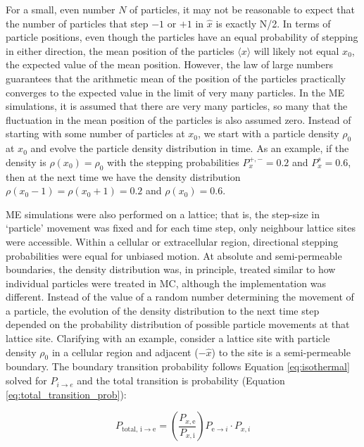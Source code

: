 	For a small, even number $ N $ of particles, it may not be reasonable to expect that the number of particles that step $ -1 $ or $ +1 $ in $ \hat{x} $ is exactly N/2. In terms of particle positions, even though the particles have an equal probability of stepping in either direction, the mean position of the particles $ \langle x \rangle $ will likely not equal $ x_0 $, the expected value of the mean position. However, the law of large numbers guarantees that the arithmetic mean of the position of the particles practically converges to the expected value in the limit of very many particles. In the ME simulations, it is assumed that there are very many particles, so many that the fluctuation in the mean position of the particles is also assumed zero. Instead of starting with some number of particles at $ x_0 $, we start with a particle density $ \rho_0 $ at $ x_0 $ and evolve the particle density distribution in time. As an example, if the density is $ \rho(x_0) = \rho_0 $ with the stepping probabilities $ P_x^{+,-} = 0.2 $ and $ P_x^{s} = 0.6 $, then at the next time we have the density distribution $ \rho(x_0 - 1) = \rho(x_0 + 1) = 0.2 $ and $ \rho(x_0) = 0.6 $. 
	
	ME simulations were also performed on a lattice; that is, the step-size in `particle' movement was fixed and for each time step, only neighbour lattice sites were accessible. Within a cellular or extracellular region, directional stepping probabilities were equal for unbiased motion. At absolute and semi-permeable boundaries, the density distribution was, in principle, treated similar to how individual particles were treated in MC, although the implementation was different. Instead of the value of a random number determining the movement of a particle, the evolution of the density distribution to the next time step depended on the probability distribution of possible particle movements at that lattice site. Clarifying with an example, consider a lattice site with particle density $ \rho_0 $ in a cellular region and adjacent ($ -\hat{x} $) to the site is a semi-permeable boundary. The boundary transition probability follows Equation \ref{eq:isothermal} solved for $ P_{i \rightarrow e} $ and the total transition is probability (Equation \ref{eq:total_transition_prob}):
	
	\begin{equation}
		P_{\textrm{total},\, \textrm{i} \rightarrow \textrm{e}} = \left( \dfrac{P_{x,\textrm{e}}}{P_{x,\textrm{i}}}\right)  P_{\textrm{e}\rightarrow i} \cdot P_{x,i}
	\end{equation}	
	
